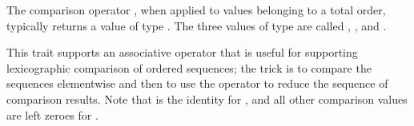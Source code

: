 %
%
%
%


The comparison operator , when applied to values belonging
to a total order, typically returns a value of type .
The three values of type  are
called , , and .

This trait supports an associative operator  that
is useful for supporting lexicographic comparison of ordered sequences;
the trick is to compare the sequences elementwise and then to use the
 operator to reduce the sequence of comparison results.
Note that  is the identity for ,
and all other comparison values are left zeroes for .


